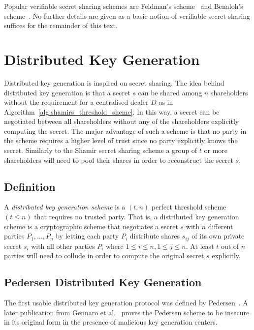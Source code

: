 Popular verifiable secret sharing schemes are Feldman's scheme~\cite{art:Feldman87} and Benaloh's scheme~\cite{art:Benaloh86a}. No further details are given as a basic notion of verifiable secret sharing suffices for the remainder of this text.

\section{Distributed Key Generation}
\label{sec:distributed_key_generation}
Distributed key generation is inspired on secret sharing. The idea behind distributed key generation is that a secret $s$ can be shared among $n$ shareholders without the requirement for a centralised dealer $D$ as in Algorithm~\ref{alg:shamirs_threshold_sheme}. In this way, a secret can be negotiated between all shareholders without any of the shareholders explicitly computing the secret. The major advantage of such a scheme is that no party in the scheme requires a higher level of trust since no party explicitly knows the secret. Similarly to the Shamir secret sharing scheme a group of $t$ or more shareholders will need to pool their shares in order to reconstruct the secret $s$.

\subsection{Definition}
\begin{defn}
\label{def:dkg_scheme}
 A \textit{distributed key generation scheme} is a $\left( t,n \right)$ perfect threshold scheme $\left( t \leq n \right)$ that requires no trusted party. That is, a distributed key generation scheme is a cryptographic scheme that negotiates a secret $s$ with $n$ different parties $P_1, \ldots, P_n$ by letting each party $P_i$ distribute shares $s_{ij}$ of its own private secret $s_i$ with all other parties $P_i$ where $1 \leq i \leq n, 1 \leq j \leq n$. At least $t$ out of $n$ parties will need to collude in order to compute the original secret $s$ explicitly.
\end{defn}

\subsection{Pedersen Distributed Key Generation}
The first usable distributed key generation protocol was defined by Pedersen~\cite{art:Pedersen91a}. A later publication from Gennaro et al.~\cite{art:GennaroJKR07} proves the Pedersen scheme to be insecure in its original form in the presence of malicious key generation centers.

